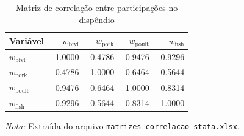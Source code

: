 \begin{table}[H]
\centering
\caption{Matriz de correlação entre participações no dispêndio}
\label{tab:correlacao-participacoes}
\small
\begin{tabular}{@{}lrrrr@{}}
\toprule
Variável & $\bar{w}_{\text{bfvl}}$ & $\bar{w}_{\text{pork}}$ & $\bar{w}_{\text{poult}}$ & $\bar{w}_{\text{fish}}$ \\
\midrule
$\bar{w}_{\text{bfvl}}$ & 1.0000 & 0.4786 & -0.9476 & -0.9296 \\
$\bar{w}_{\text{pork}}$ & 0.4786 & 1.0000 & -0.6464 & -0.5644 \\
$\bar{w}_{\text{poult}}$ & -0.9476 & -0.6464 & 1.0000 & 0.8314 \\
$\bar{w}_{\text{fish}}$ & -0.9296 & -0.5644 & 0.8314 & 1.0000 \\
\bottomrule
\end{tabular}
\par\vspace{0.35em}
\begin{minipage}{0.92\textwidth}\footnotesize \textit{Nota:} Extraída do arquivo \texttt{matrizes\_correlacao\_stata.xlsx}.\end{minipage}
\end{table}
